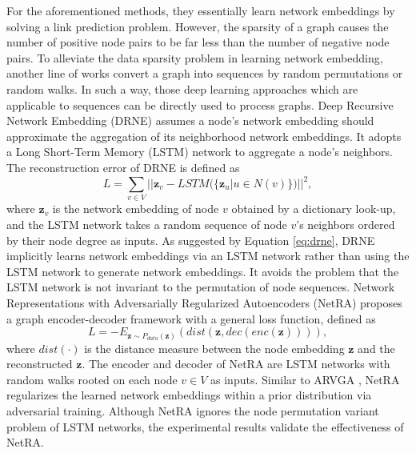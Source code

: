 	
    For the aforementioned methods, they essentially learn network embeddings by solving a link prediction problem. However, the sparsity of a graph causes the number of positive node pairs to be far less than the number of negative node pairs. To alleviate the data sparsity problem in learning network embedding, another line of works convert a graph into sequences by random permutations or random walks. In such a way, those deep learning approaches which are applicable to sequences can be directly used to process graphs.
	Deep Recursive Network Embedding (DRNE) \cite{tu2018deep} assumes a node's network embedding should approximate the aggregation of its neighborhood network embeddings. It adopts a Long Short-Term Memory (LSTM) network \cite{hochreiter1997long} to aggregate a node's neighbors. The reconstruction error of DRNE is defined as 
	\begin{equation}
	\label{eq:drne}
	    L = \sum_{v\in V} ||\mathbf{z}_v-LSTM(\{\mathbf{z}_u|u\in N(v)\})||^2,
	\end{equation}
	where $\mathbf{z}_v$ is the network embedding of node $v$ obtained by a dictionary look-up, and the LSTM network takes a random sequence of node $v$'s neighbors ordered by their node degree as inputs. As suggested by Equation \ref{eq:drne}, DRNE implicitly learns network embeddings via an LSTM network rather than using the LSTM network to generate network embeddings. It avoids the problem that the LSTM network is not invariant to the permutation of node sequences. 
	Network Representations with Adversarially Regularized Autoencoders (NetRA) \cite{yu2018learning} proposes a graph encoder-decoder framework with a general loss function, defined as
    \begin{equation}
        L= -E_{\mathbf{z}\sim P_{data}(\mathbf{z})}(dist(\mathbf{z},dec(enc(\mathbf{z})))),
    \end{equation}
    where $dist(\cdot)$ is the distance measure between the node embedding $\mathbf{z}$ and the reconstructed $\mathbf{z}$. The encoder and decoder of NetRA are LSTM networks with random walks rooted on each node $v\in V$ as inputs.
    Similar to ARVGA \cite{pan2018adversarially}, NetRA regularizes the learned network embeddings within a prior distribution via adversarial training. Although NetRA ignores the node permutation variant problem of LSTM networks, the experimental results validate the effectiveness of NetRA. 
	
